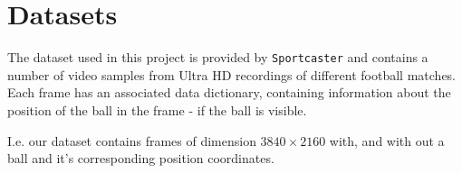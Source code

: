 
\section{Datasets}

The dataset used in this project is provided by \texttt{Sportcaster}
and contains a number of video samples from Ultra HD recordings of
different football matches. Each frame has an associated data
dictionary, containing information about the position of the ball in
the frame - if the ball is visible.

I.e. our dataset contains frames of dimension $3840 \times 2160$ with,
and with out a ball and it's corresponding position coordinates.

